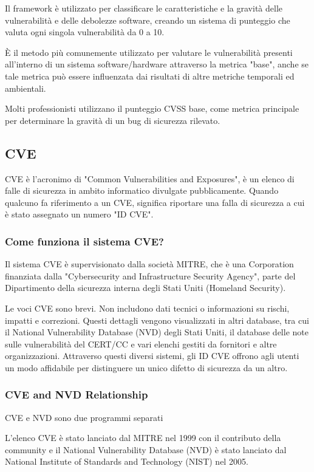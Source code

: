 Il framework è utilizzato per classificare le caratteristiche e la gravità delle vulnerabilità e delle debolezze software, creando un sistema di punteggio che valuta ogni singola vulnerabilità da 0 a 10.

È il metodo più comunemente utilizzato per valutare le vulnerabilità presenti all'interno di un sistema software/hardware attraverso la metrica "base", anche se tale metrica può essere influenzata dai risultati di altre metriche temporali ed ambientali.

Molti professionisti utilizzano il punteggio CVSS base, come metrica principale per determinare la gravità di un bug di sicurezza rilevato. 

\subsection{CVE}

CVE è l'acronimo di "Common Vulnerabilities and Exposures", è un elenco di falle di sicurezza in ambito informatico divulgate pubblicamente. Quando qualcuno fa riferimento a un CVE, significa riportare una falla di sicurezza a cui è stato assegnato un numero "ID CVE".


\subsubsection{Come funziona il sistema CVE?}
Il sistema CVE è supervisionato dalla società MITRE\cite{MITRE}, che è una Corporation finanziata dalla "Cybersecurity and Infrastructure Security Agency", parte del Dipartimento della sicurezza interna degli Stati Uniti (Homeland Security).

Le voci CVE sono brevi. Non includono dati tecnici o informazioni su rischi, impatti e correzioni. Questi dettagli vengono visualizzati in altri database, tra cui il National Vulnerability Database (NVD) degli Stati Uniti, il database delle note sulle vulnerabilità del CERT/CC e vari elenchi gestiti da fornitori e altre organizzazioni. Attraverso questi diversi sistemi, gli ID CVE offrono agli utenti un modo affidabile per distinguere un unico difetto di sicurezza da un altro.

\subsubsection{CVE and NVD Relationship\cite{MITRE}}

CVE e NVD sono due programmi separati

L'elenco CVE è stato lanciato dal MITRE nel 1999 con il contributo della community e il National Vulnerability Database (NVD) è stato lanciato dal National Institute of Standards and Technology (NIST) nel 2005.

